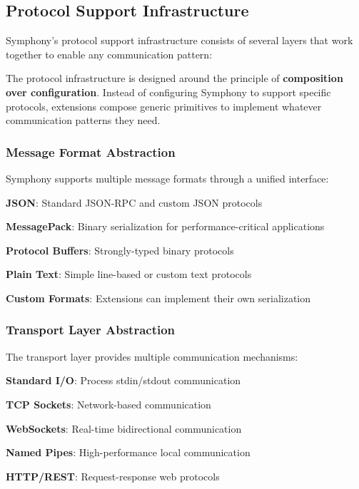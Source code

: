 \subsection*{Protocol Support Infrastructure}

Symphony's protocol support infrastructure consists of several layers that work together to enable any communication pattern:

\begin{infobox}[title=Generic Protocol Architecture]
The protocol infrastructure is designed around the principle of \textbf{composition over configuration}. Instead of configuring Symphony to support specific protocols, extensions compose generic primitives to implement whatever communication patterns they need.
\end{infobox}

\subsubsection*{Message Format Abstraction}

Symphony supports multiple message formats through a unified interface:

\begin{compactlist}
    \item \textbf{JSON}: Standard JSON-RPC and custom JSON protocols
    \item \textbf{MessagePack}: Binary serialization for performance-critical applications
    \item \textbf{Protocol Buffers}: Strongly-typed binary protocols
    \item \textbf{Plain Text}: Simple line-based or custom text protocols
    \item \textbf{Custom Formats}: Extensions can implement their own serialization
\end{compactlist}

\subsubsection*{Transport Layer Abstraction}

The transport layer provides multiple communication mechanisms:

\begin{compactlist}
    \item \textbf{Standard I/O}: Process stdin/stdout communication
    \item \textbf{TCP Sockets}: Network-based communication
    \item \textbf{WebSockets}: Real-time bidirectional communication
    \item \textbf{Named Pipes}: High-performance local communication
    \item \textbf{HTTP/REST}: Request-response web protocols
\end{compactlist}

